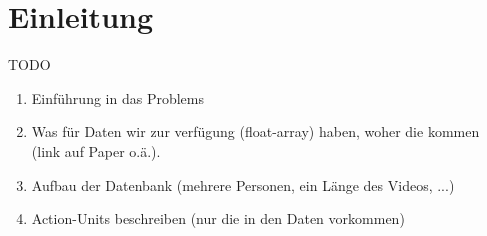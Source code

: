 \chapter{Einleitung}
TODO

\begin{enumerate}
  \item Einführung in das Problems
  \item Was für Daten wir zur verfügung (float-array) haben, woher die kommen (link auf Paper o.ä.).
  \item Aufbau der Datenbank (mehrere Personen, ein Länge des Videos, ...)
  \item Action-Units beschreiben (nur die in den Daten vorkommen)
\end{enumerate}
